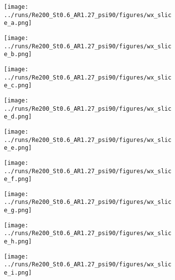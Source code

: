 \begin{figure}
  \centering
  \begin{subfigure}[b]{0.2\textwidth}
    \centering
    \texttt{[image: ../runs/Re200\_St0.6\_AR1.27\_psi90/figures/wx\_slice\_a.png]}
    \caption{}
  \end{subfigure}
  \hfill
  \begin{subfigure}[b]{0.2\textwidth}
    \centering
    \texttt{[image: ../runs/Re200\_St0.6\_AR1.27\_psi90/figures/wx\_slice\_b.png]}
    \caption{}
  \end{subfigure}
  \hfill
  \begin{subfigure}[b]{0.2\textwidth}
    \centering
    \texttt{[image: ../runs/Re200\_St0.6\_AR1.27\_psi90/figures/wx\_slice\_c.png]}
    \caption{}
  \end{subfigure}
  \hfill
  \begin{subfigure}[b]{0.2\textwidth}
    \centering
    \texttt{[image: ../runs/Re200\_St0.6\_AR1.27\_psi90/figures/wx\_slice\_d.png]}
    \caption{}
  \end{subfigure}
  \vspace{0.5cm}
  \begin{subfigure}[b]{0.2\textwidth}
    \centering
    \texttt{[image: ../runs/Re200\_St0.6\_AR1.27\_psi90/figures/wx\_slice\_e.png]}
    \caption{}
  \end{subfigure}
  \hfill
  \begin{subfigure}[b]{0.2\textwidth}
    \centering
    \texttt{[image: ../runs/Re200\_St0.6\_AR1.27\_psi90/figures/wx\_slice\_f.png]}
    \caption{}
  \end{subfigure}
  \hfill
  \begin{subfigure}[b]{0.2\textwidth}
    \centering
    \texttt{[image: ../runs/Re200\_St0.6\_AR1.27\_psi90/figures/wx\_slice\_g.png]}
    \caption{}
  \end{subfigure}
  \hfill
  \begin{subfigure}[b]{0.2\textwidth}
    \centering
    \texttt{[image: ../runs/Re200\_St0.6\_AR1.27\_psi90/figures/wx\_slice\_h.png]}
    \caption{}
  \end{subfigure}
  \vspace{0.5cm}
  \begin{subfigure}[b]{0.2\textwidth}
    \centering
    \texttt{[image: ../runs/Re200\_St0.6\_AR1.27\_psi90/figures/wx\_slice\_i.png]}
    \caption{}
  \end{subfigure}
  \hfill

\end{figure}
